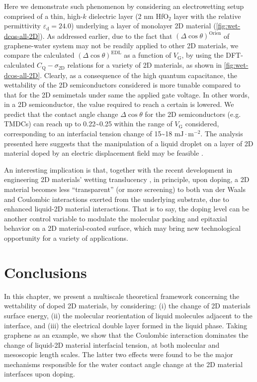 Here we demonstrate such phenomenon by considering an electrowetting
setup comprised of a thin, high-\(k\) dielectric layer (2 nm
HfO\(_{\text{2}}\) layer with the relative permittivity
\(\varepsilon_{\mathrm{d}}=24.0\)) underlying a layer of monolayer 2D
material (\autoref{fig:wet-dcos-all-2D}).  As addressed earlier, due
to the fact that \((\Delta \cos \theta)^{\mathrm{Orien}}\) of
graphene-water system may not be readily applied to other 2D
materials, we compare the calculated
\((\Delta \cos \theta)^{\mathrm{EDL}}\) as a function of
\(V_{\mathrm{G}}\), by using the DFT-calculated
\(C_{\mathrm{Q}} - \sigma_{\mathrm{2D}}\) relations for a variety of
2D materials, as shown in \autoref{fig:wet-dcos-all-2D}. Clearly, as a
consequence of the high quantum capacitance, the wettability of the 2D
semiconductors considered is more tunable compared to that for the 2D
semimetals under same the applied gate voltage. In other words, in a 2D
semiconductor, the value required to reach a certain is lowered. We
predict that the contact angle change \(\Delta \cos \theta\) for the
2D semiconductors (e.g. TMDCs) can reach up to
0.22\textasciitilde{}0.25 within the range of \(V_{\mathrm{G}}\)
considered, corresponding to an interfacial tension change of
15\textasciitilde{}18 \(\mathrm{mJ} \cdot \mathrm{m}^{-2}\). The
analysis presented here suggests that the manipulation of a liquid
droplet on a layer of 2D material doped by an electric displacement
field may be feasible \autocite{Mugele_2005_EW_rev,Hayes_2003_nature_EWOD}.

An interesting implication is that, together with the recent
development in engineering 2D materials’ wetting translucency
\autocite{Raj_2013_wetting_rev,rafiee_2012_transparency,Shih_2012_prl,shih_2013_wetting_natmat},
in principle, upon doping, a 2D material becomes less “transparent” (or more screening)
to both van der Waals and Coulombic interactions exerted from the underlying
substrate, due to enhanced liquid-2D material interactions. That is to say, the doping level can be
another control variable to modulate the molecular packing and
epitaxial behavior on a 2D material-coated surface, which may bring
new technological opportunity for a variety of applications.


\section{Conclusions}
\label{sec:wet-conclusions}

In this chapter, we present a multiscale theoretical framework
concerning the wettability of doped 2D materials, by considering: (i)
the change of 2D materials surface energy, (ii) the molecular
reorientation of liquid molecules adjacent to the interface, and (iii)
the electrical double layer formed in the liquid phase. Taking
graphene as an example, we show that the Coulombic interaction
dominates the change of liquid-2D material interfacial tension, at
both molecular and mesoscopic length scales. The latter two effects were
found to be the major mechanisms responsible for the water contact angle
change at the 2D material interfaces upon doping.

